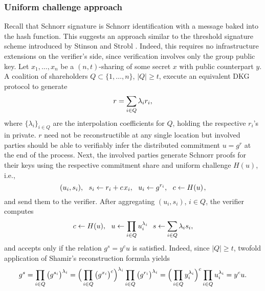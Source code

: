 \documentclass[psamsfonts, reqno]{amsart}
\theoremstyle{definition}
\theoremstyle{remark}
\numberwithin{equation}{section}
\begin{document}
\subsubsection{Uniform challenge approach}\label{section_uniform_challenge}

Recall that Schnorr signature is
Schnorr identification with a message baked
into the hash function.
This suggests an approach similar to the
threshold signature scheme introduced
by Stinson and Strobl \cite{paper_stinson_strobl}.
Indeed, this requires no infrastructure extensions
on the verifier's side, since verification
involves only the group public key.
Let $x_1, \dots, x_n$ be a
$(n,t)$-sharing of some secret $x$
with public counterpart $y$.
A coalition of shareholders $Q \subset \{1, \dots, n\}$,
$|Q| \ge t$, execute an equivalent DKG protocol to generate
\vspace{5pt}
\begin{equation*}
r = \sum_{i \in Q} \lambda_i r_i,
\vspace{5pt}
\end{equation*}
where $\{\lambda_i\}_{i \in Q}$ are the interpolation coefficients
for $Q$, holding the respective $r_i$'s in private.
$r$ need not be reconstructible
at any single location but involved parties should be able to
verifiably infer the distributed commitment
$u = g^r$ at the end of the process.
Next, the involved parties generate Schnorr proofs
for their keys using the respective commitment share
and uniform challenge $H(u)$, i.e.,
\vspace{5pt}
\begin{equation*}
(u_i, s_i),
\ \ s_i \leftarrow r_i + c\hspace{1pt}x_i,
\ \ u_i \leftarrow g ^ {r_i},
\ \ c \leftarrow H(u)
\hspace{1pt},
\vspace{5pt}
\end{equation*}
and send them to the verifier. 
After aggregating $(u_i, s_i)$, $i \in Q$,
the verifier computes
\vspace{5pt}
\begin{equation*}
c \leftarrow H(u),
\ \ u \leftarrow \prod_{i \in Q} u_i ^ {\lambda_i}
\ \ s \leftarrow \sum_{i \in Q} \lambda_i s_i,
\vspace{5pt}
\end{equation*}
and accepts only if the relation
$g ^ s = y ^ c u$ is satisfied.
Indeed, since $|Q| \ge t$,
twofold application of Shamir's reconstruction formula yields
\vspace{5pt}
\begin{equation*}
g ^ s =
\prod_{i \in Q} \big(g ^ {s_i}\big)^{\lambda_i} =
\Big(\prod_{i \in Q}\big(g ^ {x_i}\big)^c\Big)^{\lambda_i} \prod_{i \in Q}\big(g ^ {r_i}\big) ^ {\lambda_i} =
\Big(\prod_{i \in Q}y_i^{\lambda_i}\Big)^c \prod_{i \in Q}u_i^{\lambda_i}=
y^c u.
\vspace{5pt}
\end{equation*}
\end{document}
